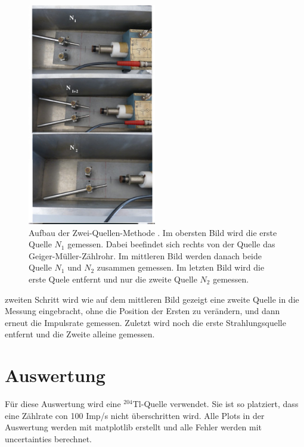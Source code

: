 \begin{figure}[H]
    \centering
    \includegraphics[width=0.5\textwidth]{images/quelle.jpg}
    \caption{Aufbau der Zwei-Quellen-Methode \cite{V703}.
    Im obersten Bild wird die erste Quelle $N_1$  gemessen. Dabei beefindet sich rechts von 
    der Quelle das Geiger-Müller-Zählrohr. Im mittleren Bild werden danach beide Quelle $N_1$ und $N_2$ zusammen
    gemessen. Im letzten Bild wird die erste Quele entfernt und nur die zweite Quelle $N_2$ gemessen.
    }
    \label{fig:6}
\end{figure}
\justifying zweiten Schritt wird wie auf dem mittleren Bild gezeigt eine zweite Quelle in
die Messung eingebracht, ohne die Position der Ersten zu verändern, und dann
erneut die Impulsrate gemessen. Zuletzt wird noch die erste Strahlungsquelle
entfernt und die Zweite alleine gemessen.


\section{Auswertung}

Für diese Auswertung wird eine $^{204}$Tl-Quelle verwendet. Sie ist so 
platziert, dass eine Zählrate con 100 Imp/s nicht überschritten wird.
Alle Plots in der Auswertung werden mit matplotlib \cite{matplotlib} erstellt und alle Fehler werden mit
uncertainties \cite{uncertainties} berechnet.

